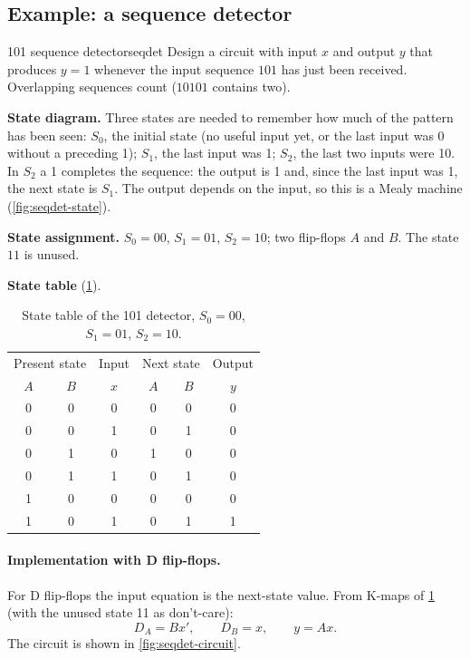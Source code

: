 \subsection{Example: a sequence detector}
\begin{example}{101 sequence detector}{seqdet}
Design a circuit with input $x$ and output $y$ that produces $y=1$ whenever the input sequence $101$ has just been received. Overlapping sequences count ($10101$ contains two).

\textbf{State diagram.} Three states are needed to remember how much of the pattern has been seen: $S_0$, the initial state (no useful input yet, or the last input was 0 without a preceding 1); $S_1$, the last input was 1; $S_2$, the last two inputs were 10. In $S_2$ a 1 completes the sequence: the output is 1 and, since the last input was 1, the next state is $S_1$. The output depends on the input, so this is a Mealy machine (\cref{fig:seqdet-state}).

\textbf{State assignment.} $S_0=00$, $S_1=01$, $S_2=10$; two flip-flops $A$ and $B$. The state $11$ is unused.

\textbf{State table} (\cref{tab:seqdet}).
\end{example}

\begin{table}[htbp]
\centering
\caption{State table of the 101 detector, $S_0=00$, $S_1=01$, $S_2=10$.}
\label{tab:seqdet}
\begin{tabular}{cc|c|cc|c}
\toprule
\multicolumn{2}{c|}{Present state} & Input & \multicolumn{2}{c|}{Next state} & Output\\
$A$&$B$&$x$&$A$&$B$&$y$\\ \midrule
0&0&0&0&0&0\\0&0&1&0&1&0\\0&1&0&1&0&0\\0&1&1&0&1&0\\
1&0&0&0&0&0\\1&0&1&0&1&1\\ \bottomrule
\end{tabular}
\end{table}


\paragraph{Implementation with D flip-flops.} For D flip-flops the input equation is the next-state value. From K-maps of \cref{tab:seqdet} (with the unused state 11 as don't-care):
\[
 D_A = Bx',\qquad D_B = x,\qquad y = Ax .
\]
The circuit is shown in \cref{fig:seqdet-circuit}.

